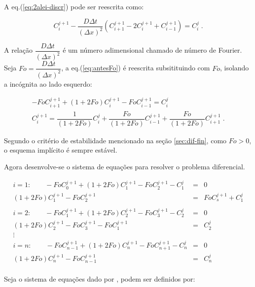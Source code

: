A eq.(\ref{eq:2alei-discr}) pode ser reescrita como:

\begin{equation}
\label{eq:antesFo}
C_i^{j+1} - \frac{D\Delta t}{(\Delta x)^2} (C_{i+1}^{j+1} - 2C_i^{j+1} + C_{i-1}^{j+1}) = C_i^j \;.
\end{equation}

A relação $\dfrac{D\Delta t}{(\Delta x)^2}$ é um número adimensional chamado de número de Fourier. Seja $Fo = \dfrac{D\Delta t}{(\Delta x)^2} $, a eq.(\ref{eq:antesFo}) é reescrita subsitituindo com $Fo$, isolando a incógnita ao lado esquerdo:

\begin{gather*}
\label{eq:depoisFo}
- FoC_{i+1}^{j+1} + (1+2Fo)C_i^{j+1} - FoC_{i-1}^{j+1} = C_i^j \\
C_i^{j+1} = \dfrac{1}{(1+2Fo)}C_i^j + \dfrac{Fo}{(1+2Fo)}C_{i-1}^{j+1} + \dfrac{Fo}{(1+2Fo)}C_{i+1}^{j+1} \;.
\end{gather*}

Segundo o critério de estabilidade mencionado na seção \ref{sec:dif-fin}, como $Fo>0$, o esquema implícito é sempre estável.

Agora desenvolve-se o sistema de equações para resolver o problema diferencial.

\begin{equation*}
\label{eq:depoisFo}
\begin{matrix}
i = 1: \qquad -FoC_{0}^{j+1} + (1+2Fo)C_1^{j+1} - FoC_{2}^{j+1} - C_1^j & = & 0\\
(1+2Fo)C_1^{j+1} - FoC_{2}^{j+1}& = & FoC_{s}^{j+1}  + C_1^j \\ 
\\
i = 2: \qquad -FoC_{1}^{j+1} + (1+2Fo)C_2^{j+1} - FoC_{3}^{j+1} - C_2^j & = & 0\\
(1+2Fo)C_2^{j+1} - FoC_{3}^{j+1} - FoC_{1}^{j+1} & = & C_2^j \\ 
\vdots \\
i = n: \qquad -FoC_{n-1}^{j+1} + (1+2Fo)C_n^{j+1} - FoC_{n+1}^{j+1} - C_n^j & = & 0\\
(1+2Fo)C_n^{j+1} - FoC_{n-1}^{j+1} & = & C_n^j \\ 
\end{matrix}
\end{equation*}

Seja o sistema de equações dado por ,  podem ser definidos por:

